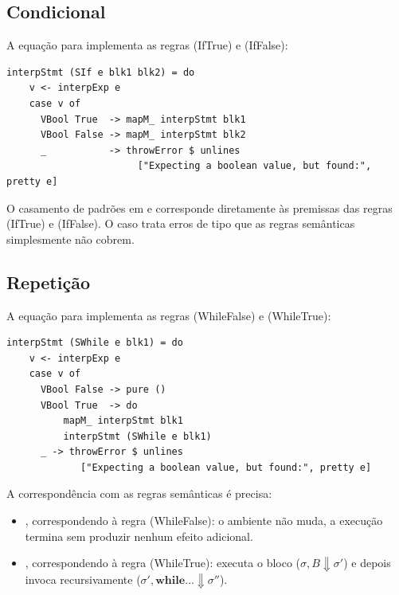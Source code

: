 \subsection{Condicional}

A equação para  implementa as regras
(IfTrue) e (IfFalse):

\begin{verbatim}
interpStmt (SIf e blk1 blk2) = do
    v <- interpExp e
    case v of
      VBool True  -> mapM_ interpStmt blk1
      VBool False -> mapM_ interpStmt blk2
      _           -> throwError $ unlines
                       ["Expecting a boolean value, but found:", pretty e]
\end{verbatim}

O casamento de padrões em  e
 corresponde diretamente às
premissas das regras (IfTrue) e (IfFalse). O caso
\haskell{_} trata erros de tipo que as regras
semânticas simplesmente não cobrem.

\subsection{Repetição}

A equação para  implementa as regras
(WhileFalse) e (WhileTrue):

\begin{verbatim}
interpStmt (SWhile e blk1) = do
    v <- interpExp e
    case v of
      VBool False -> pure ()
      VBool True  -> do
          mapM_ interpStmt blk1
          interpStmt (SWhile e blk1)
      _ -> throwError $ unlines
             ["Expecting a boolean value, but found:", pretty e]
\end{verbatim}

A correspondência com as regras semânticas é precisa:

\begin{itemize}
  \item
    , correspondendo à regra
    (WhileFalse): o ambiente não muda, a execução termina sem
    produzir nenhum efeito adicional.
  \item
    , correspondendo à regra (WhileTrue): executa o
    bloco (\(\sigma, B \Downarrow \sigma'\)) e depois invoca
    recursivamente (\(\sigma', \mathbf{while}\ldots \Downarrow \sigma''\)).
\end{itemize}

